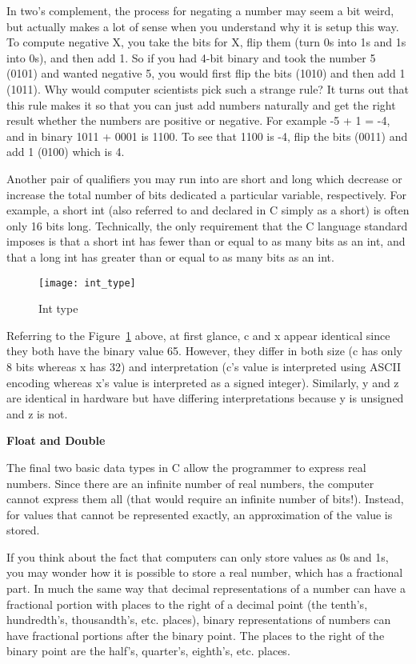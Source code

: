 \documentclass[11pt, a4paper]{article}
\begin{document}
In two's complement, the process for negating a number may seem a bit weird, but actually makes a lot of sense when you understand why it is setup this way. To compute negative X, you take the bits for X, flip them (turn 0s into 1s and 1s into 0s), and then add 1. So if you had 4-bit binary and took the number 5 (0101) and wanted negative 5, you would first flip the bits (1010) and then add 1 (1011). Why would computer scientists pick such a strange rule? It turns out that this rule makes it so that you can just add numbers naturally and get the right result whether the numbers are positive or negative. For example -5 + 1 = -4, and in binary 1011 + 0001 is 1100. To see that 1100 is -4, flip the bits (0011) and add 1 (0100) which is 4.

Another pair of qualifiers you may run into are short and long which decrease or increase the total number of bits dedicated a particular variable, respectively. For example, a short int (also referred to and declared in C simply as a short) is often only 16 bits long. Technically, the only requirement that the C language standard imposes is that a short int has fewer than or equal to as many bits as an int, and that a long int has greater than or equal to as many bits as an int.



\begin{figure}[htpb]
  \centering
  \texttt{[image: int\_type]}
  \caption{Int type}
  \label{fig:int_type}
\end{figure}


Referring to the Figure~\ref{fig:int_type} above, at first glance, c and x appear identical since they both have the binary value 65. However, they differ in both size (c has only 8 bits whereas x has 32) and interpretation (c’s value is interpreted using ASCII encoding whereas x’s value is interpreted as a signed integer). Similarly, y and z are identical in hardware but have differing interpretations because y is unsigned and z is not.



\textbf{Float and Double}


The final two basic data types in C allow the programmer to express real numbers. Since there are an infinite number of real numbers, the computer cannot express them all (that would require an infinite number of bits!). Instead, for values that cannot be represented exactly, an approximation of the value is stored.

If you think about the fact that computers can only store values as 0s and 1s, you may wonder how it is possible to store a real number, which has a fractional part. In much the same way that decimal representations of a number can have a fractional portion with places to the right of a decimal point (the tenth’s, hundredth’s, thousandth’s, etc. places), binary representations of numbers can have fractional portions after the binary point. The places to the right of the binary point are the half’s, quarter’s, eighth’s, etc. places.
\end{document}
